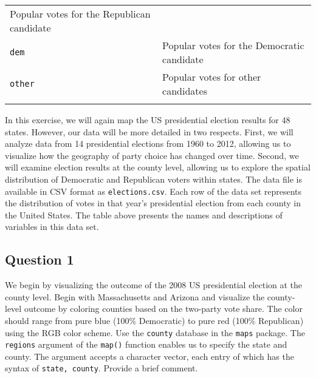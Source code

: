 \documentclass[]{article}
\begin{document}
\begin{longtable}[c]{@{}ll@{}}
\begin{minipage}[t]{0.74\columnwidth}
Popular votes for the Republican candidate
\end{minipage}
\\\addlinespace
\begin{minipage}[t]{0.19\columnwidth}\raggedright
\texttt{dem}
\end{minipage} & \begin{minipage}[t]{0.74\columnwidth}\raggedright
Popular votes for the Democratic candidate
\end{minipage}
\\\addlinespace
\begin{minipage}[t]{0.19\columnwidth}\raggedright
\texttt{other}
\end{minipage} & \begin{minipage}[t]{0.74\columnwidth}\raggedright
Popular votes for other candidates
\end{minipage}
\\\addlinespace
\bottomrule
\end{longtable}

In this exercise, we will again map the US presidential election results
for 48 states. However, our data will be more detailed in two respects.
First, we will analyze data from 14 presidential elections from 1960 to
2012, allowing us to visualize how the geography of party choice has
changed over time. Second, we will examine election results at the
county level, allowing us to explore the spatial distribution of
Democratic and Republican voters within states. The data file is
available in CSV format as \texttt{elections.csv}. Each row of the data
set represents the distribution of votes in that year's presidential
election from each county in the United States. The table above presents
the names and descriptions of variables in this data set.

\subsection{Question 1}\label{question-1}

We begin by visualizing the outcome of the 2008 US presidential election
at the county level. Begin with Massachusetts and Arizona and visualize
the county-level outcome by coloring counties based on the two-party
vote share. The color should range from pure blue (100\% Democratic) to
pure red (100\% Republican) using the RGB color scheme. Use the
\texttt{county} database in the \texttt{maps} package. The
\texttt{regions} argument of the \texttt{map()} function enables us to
specify the state and county. The argument accepts a character vector,
each entry of which has the syntax of \texttt{state, county}. Provide a
brief comment.
\end{document}

